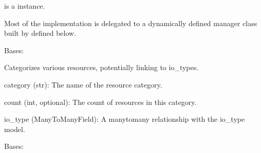 \documentclass[letterpaper,10pt,english]{sphinxmanual}
\begin{document}
\begin{fulllineitems}
\begin{fulllineitems}
\sphinxAtStartPar
{} is a  instance.

\sphinxAtStartPar
Most of the implementation is delegated to a dynamically defined manager
class built by  defined below.

\end{fulllineitems}


\end{fulllineitems}


\begin{fulllineitems}
\label{\detokenize{app:app.models.resources_categories}}
\pysigstartsignatures
{}
\pysigstopsignatures
\sphinxAtStartPar
Bases: 

\sphinxAtStartPar
Categorizes various resources, potentially linking to io\_types.
\begin{description}
\sphinxAtStartPar
category (str): The name of the resource category.

\sphinxAtStartPar
count (int, optional): The count of resources in this category.

\sphinxAtStartPar
io\_type (ManyToManyField): A many\sphinxhyphen{}to\sphinxhyphen{}many relationship with the io\_type model.

\end{description}

\begin{fulllineitems}
\label{\detokenize{app:app.models.resources_categories.DoesNotExist}}
\pysigstartsignatures
{}
\pysigstopsignatures
\sphinxAtStartPar
Bases: 

\end{fulllineitems}



\end{fulllineitems}
\end{document}
